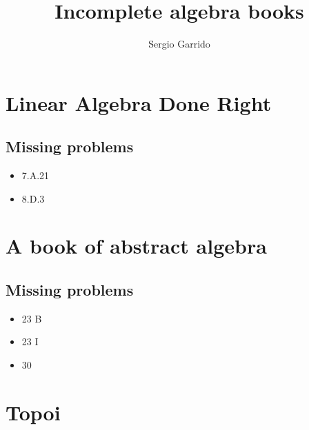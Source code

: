 \documentclass{bookSolutions}
\title{Incomplete algebra books}
\author{Sergio Garrido}
\begin{document}
\tableofcontents
\newpage

\chapter{Linear Algebra Done Right}
\section{Missing problems}
\begin{itemize}
    \item 7.A.21
    \item 8.D.3
\end{itemize}

























\newpage
\chapter{A book of abstract algebra}
\section{Missing problems}
\begin{itemize}
    \item 23 B
    \item 23 I
    \item 30
\end{itemize}


















\newpage
\chapter{Topoi}

\end{document}

